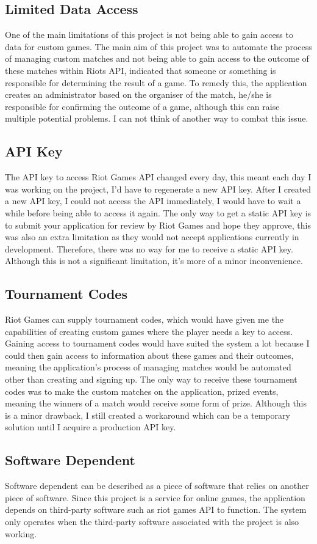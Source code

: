 \subsection{Limited Data Access}
One of the main limitations of this project is not being able to gain access to data for custom games. The main aim of this project was to automate the process of managing custom matches and not being able to gain access to the outcome of these matches within Riots API, indicated that someone or something is responsible for determining the result of a game. To remedy this, the application creates an administrator based on the organiser of the match, he/she is responsible for confirming the outcome of a game, although this can raise multiple potential problems. I can not think of another way to combat this issue.
\subsection{API Key}
The API key to access Riot Games API changed every day, this meant each day I was working on the project, I'd have to regenerate a new API key. After I created a new API key, I could not access the API immediately, I would have to wait a while before being able to access it again. The only way to get a static API key is to submit your application for review by Riot Games and hope they approve, this was also an extra limitation as they would not accept applications currently in development. Therefore, there was no way for me to receive a static API key. Although this is not a significant limitation, it's more of a minor inconvenience.
\subsection{Tournament Codes}
Riot Games can supply tournament codes, which would have given me the capabilities of creating custom games where the player needs a key to access. Gaining access to tournament codes would have suited the system a lot because I could then gain access to information about these games and their outcomes, meaning the application's process of managing matches would be automated other than creating and signing up. The only way to receive these tournament codes was to make the custom matches on the application, prized events, meaning the winners of a match would receive some form of prize. Although this is a minor drawback, I still created a workaround which can be a temporary solution until I acquire a production API key.
\subsection{Software Dependent}
Software dependent can be described as a piece of software that relies on another piece of software\cite{huang2007assessment}. Since this project is a service for online games, the application depends on third-party software such as riot games API to function. The system only operates when the third-party software associated with the project is also working. 

